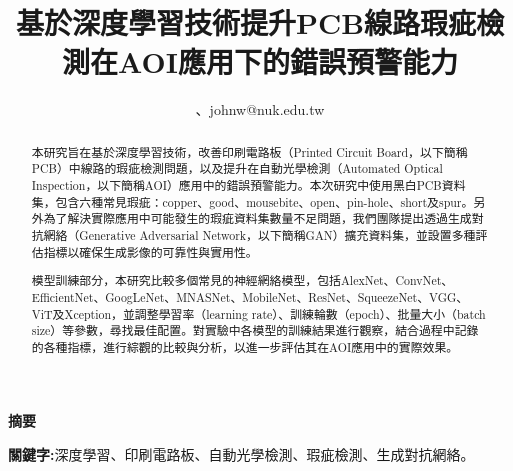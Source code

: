 \title{\fontsize{14}{0} \bf 基於深度學習技術提升PCB線路瑕疵檢測在AOI應用下的錯誤預警能力}
\author{
、johnw@nuk.edu.tw}
\maketitle %
\begin{flushleft}
  {\fontsize{12}{0} \bf 摘要}
\end{flushleft}
%
%
\begin{abstract}
  \hspace{2em}
  本研究旨在基於深度學習技術，改善印刷電路板（Printed Circuit Board，以下簡稱PCB）中線路的瑕疵檢測問題，以及提升在自動光學檢測（Automated Optical Inspection，以下簡稱AOI）應用中的錯誤預警能力。本次研究中使用黑白PCB資料集，包含六種常見瑕疵：copper、good、mousebite、open、pin-hole、short及spur。另外為了解決實際應用中可能發生的瑕疵資料集數量不足問題，我們團隊提出透過生成對抗網絡（Generative Adversarial Network，以下簡稱GAN）擴充資料集，並設置多種評估指標以確保生成影像的可靠性與實用性。
\end{abstract}
\begin{abstract}
  \hspace{2em}
  模型訓練部分，本研究比較多個常見的神經網絡模型，包括AlexNet、ConvNet、EfficientNet、GoogLeNet、MNASNet、MobileNet、ResNet、SqueezeNet、VGG、ViT及Xception，並調整學習率（learning rate）、訓練輪數（epoch）、批量大小（batch size）等參數，尋找最佳配置。對實驗中各模型的訓練結果進行觀察，結合過程中記錄的各種指標，進行綜觀的比較與分析，以進一步評估其在AOI應用中的實際效果。
\end{abstract}
\begin{IEEEkeywords}
    {\fontsize{10}{0} \bf 關鍵字:}深度學習、印刷電路板、自動光學檢測、瑕疵檢測、生成對抗網絡。
\end{IEEEkeywords}
\IEEEpeerreviewmaketitle
